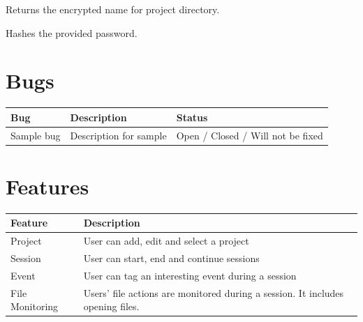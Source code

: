 \documentclass[letterpaper,10pt,english]{sphinxmanual}
\begin{document}

\begin{fulllineitems}
\label{utils:utils.get_encrypted_directory_name}
Returns the encrypted name for project directory.

\end{fulllineitems}


\begin{fulllineitems}
\label{utils:utils.hash_password}
Hashes the provided password.

\end{fulllineitems}



\chapter{Bugs}
\label{bugs::doc}\label{bugs:bugs}
\begin{tabulary}{\linewidth}{|L|L|L|}
\hline
\textbf{\relax 
Bug
} & \textbf{\relax 
Description
} & \textbf{\relax 
Status
}\\\hline

Sample bug
 & 
Description for sample
 & 
Open / Closed / Will not be fixed
\\\hline
\end{tabulary}



\chapter{Features}
\label{features::doc}\label{features:features}
\begin{tabulary}{\linewidth}{|L|L|}
\hline
\textbf{\relax 
Feature
} & \textbf{\relax 
Description
}\\\hline

Project
 & 
User can add, edit and select a project
\\\hline

Session
 & 
User can start, end and continue sessions
\\\hline

Event
 & 
User can tag an interesting event during  a session
\\\hline

File Monitoring
 & 
Users' file actions are monitored during a session. It includes opening files.
\\\hline
\end{tabulary}
\end{document}

